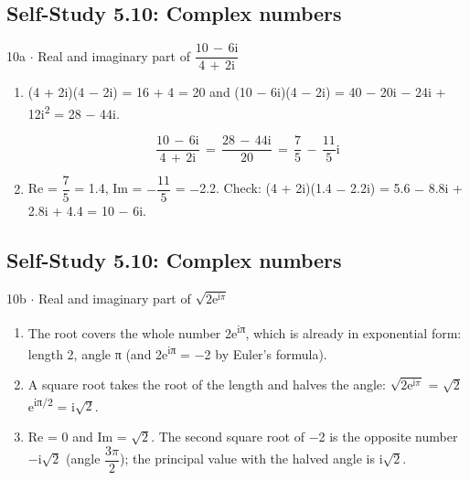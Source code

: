 \documentclass[11pt]{article}
\begin{document}
\begin{keepsection}\subsection{Self-Study 5.10: Complex numbers}

\begin{workedbox}{10a \ensuremath{\cdot} Real and imaginary part of {\small\ensuremath{\dfrac{10\, -\, 6\mathrm{i}}{4\, +\, 2\mathrm{i}}}}}
\begin{enumerate}
\item {}
(4 + 2i)(4 \ensuremath{-} 2i) = 16 + 4 = 20 and (10 \ensuremath{-} 6i)(4 \ensuremath{-} 2i) = 40 \ensuremath{-} 20i \ensuremath{-} 24i + 12i\textsuperscript{2} = 28 \ensuremath{-} 44i.

\begin{equation*}\dfrac{10\, -\, 6\mathrm{i}}{4\, +\, 2\mathrm{i}}\, =\, \dfrac{28\, -\, 44\mathrm{i}}{20}\, =\, \dfrac{7}{5}\, -\, \dfrac{11}{5}\mathrm{i}\end{equation*}
\item Re = {\small\ensuremath{\dfrac{7}{5}}} = 1.4, Im = \ensuremath{-}{\small\ensuremath{\dfrac{11}{5}}} = \ensuremath{-}2.2. Check: (4 + 2i)(1.4 \ensuremath{-} 2.2i) = 5.6 \ensuremath{-} 8.8i + 2.8i + 4.4 = 10 \ensuremath{-} 6i.
\end{enumerate}
\end{workedbox}

\end{keepsection}
\begin{keepsection}\subsection{Self-Study 5.10: Complex numbers}

\begin{workedbox}{10b \ensuremath{\cdot} Real and imaginary part of \ensuremath{\sqrt{2\mathrm{e}^{\mathrm{i}π}}}}
\begin{enumerate}
\item The root covers the whole number 2e\textsuperscript{iπ}, which is already in exponential form: length 2, angle π (and 2e\textsuperscript{iπ} = \ensuremath{-}2 by Euler’s formula).
\item A square root takes the root of the length and halves the angle: \ensuremath{\sqrt{2\mathrm{e}^{\mathrm{i}π}}} = \ensuremath{\sqrt{2}}e\textsuperscript{iπ/2} = i\ensuremath{\sqrt{2}}.
\item Re = 0 and Im = \ensuremath{\sqrt{2}}. The second square root of \ensuremath{-}2 is the opposite number \ensuremath{-}i\ensuremath{\sqrt{2}} (angle {\small\ensuremath{\dfrac{3π}{2}}}); the principal value with the halved angle is i\ensuremath{\sqrt{2}}.
\end{enumerate}
\end{workedbox}

\end{keepsection}
\end{document}
